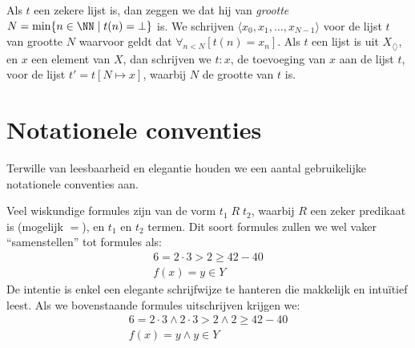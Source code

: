 Als $t$ een zekere lijst is, dan zeggen we dat hij van \emph{grootte} $N = \min\{n\in\NN \mid t(n) = \bot\}$ is.
We schrijven $\langle x_0, x_1, \dots, x_{N-1}\rangle$ voor de lijst $t$ van grootte $N$ waarvoor geldt dat $\forall_{n < N}[t(n) = x_n]$.
Als $t$ een lijst is uit $X_{\langle\rangle}$, en $x$ een element van $X$, dan schrijven we $t:x$, de toevoeging van $x$ aan de lijst $t$, voor de lijst $t' = t[N \mapsto x]$, waarbij $N$ de grootte van $t$ is.

\section{Notationele conventies}

Terwille van leesbaarheid en elegantie houden we een aantal gebruikelijke notationele conventies aan.

Veel wiskundige formules zijn van de vorm $t_1\; R\; t_2$, waarbij $R$ een zeker predikaat is (mogelijk $=$), en $t_1$ en $t_2$ termen. Dit soort formules zullen we wel vaker ``samenstellen'' tot formules als:
\begin{gather*}
  6 = 2 \cdot 3 > 2 \ge 42 - 40 \\
  f(x) = y \in Y
\end{gather*}
De intentie is enkel een elegante schrijfwijze te hanteren die makkelijk en intuïtief leest.
Als we bovenstaande formules uitschrijven krijgen we:
\begin{gather*}
  6 = 2 \cdot 3 \land 2 \cdot 3 > 2 \land 2 \ge 42 - 40 \\
  f(x) = y \land y \in Y
\end{gather*}

